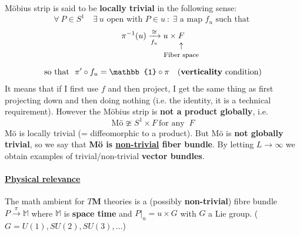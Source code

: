 \documentclass[../main.tex]{subfiles}
\begin{document}
Möbius strip is said to be \textbf{locally trivial} in the following sense:
\[
\forall\ P\in S^1 \quad \exists \ u \textrm{ open with } P\in u \ : \ \exists \textrm{ a map } f_u \textrm{ such that }
\]
\[
\pi^{-1}(u) \xrightarrow[f_u]{\cong} u\times \underset{\mathclap{\tikz \node {$\uparrow$} node [below=1ex] {\footnotesize Fiber space};}}{F} 
\]
\[
\textrm{so that }\ \pi'\circ f_u = \mathbb{1}\circ\pi \quad  \textrm{(\textbf{verticality} condition)}
\]
It means that if I first use $f$ and then project, I get the same thing as first projecting down and then doing nothing (i.e. the identity, it is a technical requirement). However the Möbius strip is \textbf{not a product globally}, i.e.
\[
\textrm{Mö}\ncong S^1 \times F \ \textrm{for any } \ F
\]
Mö is locally trivial (= diffeomorphic to a product). But Mö is \textbf{not globally trivial}, so we say that \textbf{Mö is \underline{non-trivial} fiber bundle}. By letting $L\to\infty$ we obtain examples of trivial/non-trivial \textbf{vector bundles}.
\newline
\paragraph{\underline{Physical relevance}} The math ambient for $T\mathbf{M}$ theories is a (possibly \textbf{non-trivial}) fibre bundle $P\xrightarrow{\pi}\mathbb{M}$ where $\mathbb{M}$ is \textbf{space time} and $P\big|_u=u\times G$ with $G$ a Lie group. ($G=U(1),SU(2),SU(3),\dots$)
\end{document}
